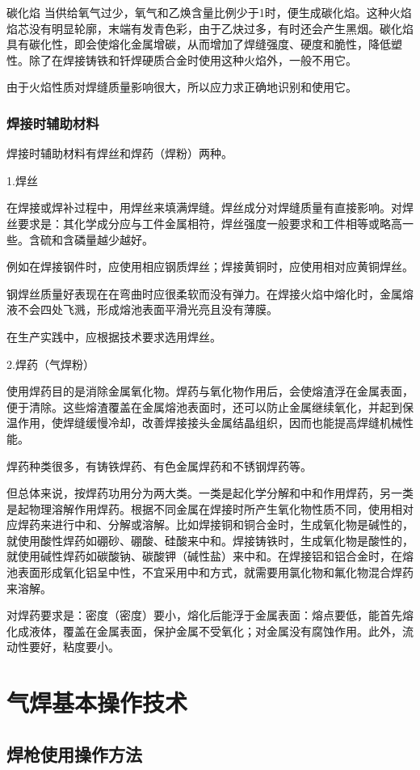 \documentclass{ctexbook}
\begin{document}
碳化焰 当供给氧气过少，氧气和乙焕含量比例少于1时，便生成碳化焰。这种火焰焰芯没有明显轮廓，末端有发青色彩，由于乙炔过多，有时还会产生黑烟。碳化焰具有碳化性，即会使熔化金属增碳，从而增加了焊缝强度、硬度和脆性，降低塑性。除了在焊接铸铁和钎焊硬质合金时使用这种火焰外，一般不用它。

由于火焰性质对焊缝质量影响很大，所以应力求正确地识别和使用它。
\subsubsection{焊接时辅助材料}
焊接时辅助材料有焊丝和焊药（焊粉）两种。

1.焊丝

在焊接或焊补过程中，用焊丝来填满焊缝。焊丝成分对焊缝质量有直接影响。对焊丝要求是：其化学成分应与工件金属相符，焊丝强度一般要求和工件相等或略高一些。含硫和含磷量越少越好。

例如在焊接钢件时，应使用相应钢质焊丝；焊接黄铜时，应使用相对应黄铜焊丝。

钢焊丝质量好表现在在弯曲时应很柔软而没有弹力。在焊接火焰中熔化时，金属熔液不会四处飞溅，形成熔池表面平滑光亮且没有薄膜。

在生产实践中，应根据技术要求选用焊丝。

2.焊药（气焊粉）

使用焊药目的是消除金属氧化物。焊药与氧化物作用后，会使熔渣浮在金属表面，便于清除。这些熔渣覆盖在金属熔池表面时，还可以防止金属继续氧化，并起到保温作用，使焊缝缓慢冷却，改善焊接接头金属结晶组织，因而也能提高焊缝机械性能。

焊药种类很多，有铸铁焊药、有色金属焊药和不锈钢焊药等。

但总体来说，按焊药功用分为两大类。一类是起化学分解和中和作用焊药，另一类是起物理溶解作用焊药。根据不同金属在焊接时所产生氧化物性质不同，使用相对应焊药来进行中和、分解或溶解。比如焊接铜和铜合金时，生成氧化物是碱性的，就使用酸性焊药如硼砂、硼酸、硅酸来中和。焊接铸铁时，生成氧化物是酸性的，就使用碱性焊药如碳酸钠、碳酸钾（碱性盐）来中和。在焊接铝和铝合金时，在熔池表面形成氧化铝呈中性，不宜采用中和方式，就需要用氯化物和氟化物混合焊药来溶解。

对焊药要求是：密度（密度）要小，熔化后能浮于金属表面：熔点要低，能首先熔化成液体，覆盖在金属表面，保护金属不受氧化；对金属没有腐蚀作用。此外，流动性要好，粘度要小。
\section{气焊基本操作技术}
\subsection{焊枪使用操作方法}
\end{document}
